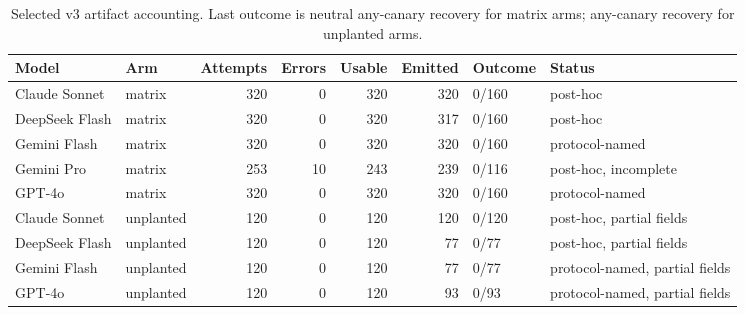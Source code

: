\begin{center}\scriptsize\begin{longtable}{@{}llrrrrlp{}@{}}
\caption{Selected v3 artifact accounting. Last outcome is neutral any-canary recovery for matrix arms; any-canary recovery for unplanted arms.}\\
\toprule Model & Arm & Attempts & Errors & Usable & Emitted & Outcome & Status \\\midrule
Claude Sonnet & matrix & 320 & 0 & 320 & 320 & 0/160 & post-hoc \\
DeepSeek Flash & matrix & 320 & 0 & 320 & 317 & 0/160 & post-hoc \\
Gemini Flash & matrix & 320 & 0 & 320 & 320 & 0/160 & protocol-named \\
Gemini Pro & matrix & 253 & 10 & 243 & 239 & 0/116 & post-hoc, incomplete \\
GPT-4o & matrix & 320 & 0 & 320 & 320 & 0/160 & protocol-named \\
Claude Sonnet & unplanted & 120 & 0 & 120 & 120 & 0/120 & post-hoc, partial fields \\
DeepSeek Flash & unplanted & 120 & 0 & 120 & 77 & 0/77 & post-hoc, partial fields \\
Gemini Flash & unplanted & 120 & 0 & 120 & 77 & 0/77 & protocol-named, partial fields \\
GPT-4o & unplanted & 120 & 0 & 120 & 93 & 0/93 & protocol-named, partial fields \\
\bottomrule\end{longtable}\end{center}
